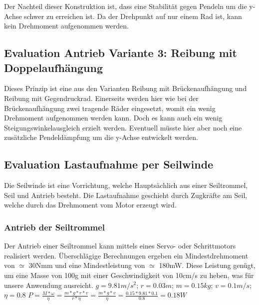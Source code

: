 \documentclass[a4paper]{report}
\begin{document}
Der Nachteil dieser Konstruktion ist, dass eine Stabilität gegen Pendeln um die y-Achse schwer zu erreichen ist. Da der Drehpunkt auf nur einem Rad ist, kann kein Drehmoment aufgenommen werden.

\subsection{Evaluation Antrieb Variante 3: Reibung mit Doppelaufhängung}
\label{app:ssec:EvalAntrieb3}
Dieses Prinzip ist eine aus den Varianten Reibung mit Brückenaufhängung und Reibung mit Gegendruckrad. Einerseits werden hier wie bei der Brückenaufhängung zwei tragende Räder eingesetzt, womit ein wenig Drehmoment aufgenommen werden kann. Doch es kann auch ein wenig Steigungswinkelausgleich erzielt werden. Eventuell müsste hier aber noch eine zusätzliche Pendeldämpfung um die y-Achse entwickelt werden.


\subsection{Evaluation Lastaufnahme per Seilwinde}
\label{app:ssec:EvalLast}
Die Seilwinde ist eine Vorrichtung, welche Hauptsächlich aus einer Seiltrommel, Seil und Antrieb besteht. Die Lastaufnahme geschieht durch Zugkräfte am Seil, welche durch das Drehmoment vom Motor erzeugt wird.

\subsubsection{Antrieb der Seiltrommel}
\label{app:ssub:Seilantrieb}
Der Antrieb einer Seiltrommel kann mittels eines Servo- oder Schrittmotors realisiert werden. Überschlägige Berechnungen ergeben ein Mindestdrehmoment von $\simeq$ 30Nmm und eine Mindestleistung von $\simeq$ 180mW. Diese Leistung genügt, um eine Masse von 100g mit einer Geschwindigkeit von 10cm/s zu heben, was für unsere Anwendung ausreicht.
\newline \newline
$g=9.81m/s^{2}$;\hspace{5mm} $r=0.03m$;\hspace{5mm} $m=0.15kg$;\hspace{5mm} $v=0.1m/s$;\hspace{5mm} $\eta=0.8$ \newline \newline
$P=\frac{M*\omega}{\eta}=\frac{m*g*r*v}{r*\eta}=\frac{m*g*v}{\eta}=\frac{0.15*9.81*0.1}{0.8}=0.18W$
\end{document}
